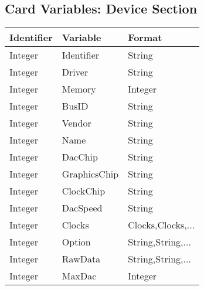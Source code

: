 \subsection{Card Variables: Device Section}
\begin{tabular}[h]{|p{2cm}|p{4cm}|p{7cm}|}
 \hline
 \textbf{Identifier} & \textbf{Variable}     & \textbf{Format}        \\
 \hline
 Integer & Identifier      & String                             \\
 Integer & Driver          & String                             \\
 Integer & Memory          & Integer                            \\
 Integer & BusID           & String                             \\
 Integer & Vendor          & String                             \\
 Integer & Name            & String                             \\
 Integer & DacChip         & String                             \\
 Integer & GraphicsChip    & String                             \\
 Integer & ClockChip       & String                             \\
 Integer & DacSpeed        & String                             \\
 Integer & Clocks          & Clocks,Clocks,...                  \\
 Integer & Option          & String,String,...                  \\
 Integer & RawData         & String,String,...                  \\
 Integer & MaxDac          & Integer                            \\
 \hline
\end{tabular}


